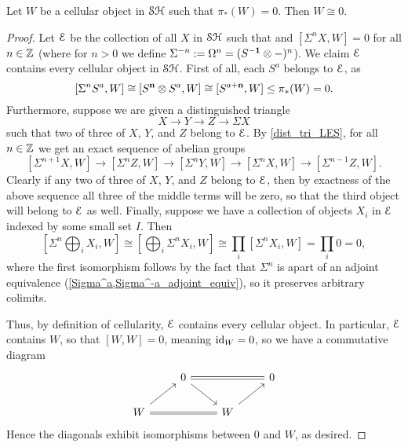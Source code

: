 \documentclass[../main.tex]{subfiles}
\begin{document}
\begin{lemma}\label{cellular_pi*=0_implies_contractible}
	Let $W$ be a cellular object in $\mathcal{SH}$ such that $\pi_*(W)=0$. Then $W\cong 0$.
\end{lemma}
\begin{proof}
	Let $\mathcal E$ be the collection of all $X$ in $\mathcal{SH}$ such that and $[\Sigma^nX,W]=0$ for all $n\in\mathbb{Z}$ (where for $n>0$ we define $\Sigma^{-n}:=\Omega^{n}=(S^{-\mathbf{1}}\otimes-)^n$). We claim $\mathcal E$ contains every cellular object in $\mathcal{SH}$. First of all, each $S^a$ belongs to $\mathcal E$, as 
	\[[\Sigma^nS^a,W]\cong[S^{\mathbf{n}}\otimes S^a,W]\cong[S^{a+\mathbf{n}},W]\leq\pi_*(W)=0.\] 
	Furthermore, suppose we are given a distinguished triangle
	\[X\to Y\to Z\to\Sigma X\]
	such that two of three of $X$, $Y$, and $Z$ belong to $\mathcal E$. By \autoref{dist_tri_LES}, for all $n\in\mathbb{Z}$ we get an exact sequence of abelian groups
	\[[\Sigma^{n+1}X,W]\to[\Sigma^nZ,W]\to[\Sigma^nY,W]\to[\Sigma^nX,W]\to[\Sigma^{n-1}Z,W].\]
	Clearly if any two of three of $X$, $Y$, and $Z$ belong to $\mathcal E$, then by exactness of the above sequence all three of the middle terms will be zero, so that the third object will belong to $\mathcal E$ as well. Finally, suppose we have a collection of objects $X_i$ in $\mathcal E$ indexed by some small set $I$. Then
	\[\left[\Sigma^n\bigoplus_iX_i,W\right]\cong\left[\bigoplus_i\Sigma^nX_i,W\right]\cong\prod_i[\Sigma^nX_i,W]=\prod_i0=0,\]
	where the first isomorphism follows by the fact that $\Sigma^n$ is apart of an adjoint equivalence (\autoref{Sigma^a,Sigma^-a_adjoint_equiv}), so it preserves arbitrary colimits.

	Thus, by definition of cellularity, $\mathcal E$ contains every cellular object. In particular, $\mathcal E$ contains $W$, so that $[W,W]=0$, meaning $\mathrm{id}_W=0$, so we have a commutative diagram
	\[\begin{tikzcd}
		& 0 && 0 \\
		W && W
		\arrow[from=2-1, to=1-2]
		\arrow[from=1-2, to=2-3]
		\arrow[from=2-3, to=1-4]
		\arrow[Rightarrow, no head, from=1-2, to=1-4]
		\arrow[Rightarrow, no head, from=2-1, to=2-3]
	\end{tikzcd}\]
	Hence the diagonals exhibit isomorphisms between $0$ and $W$, as desired.
\end{proof}
\end{document}
